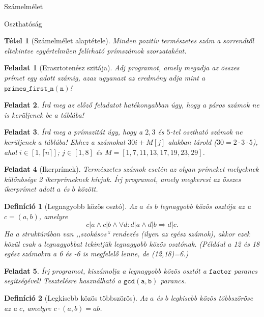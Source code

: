 \documentclass{amsbook}
\theoremstyle{mystyle}
\newtheorem{exercise}{Feladat}[part]
\newtheorem{definition}{Definíció}[section]
\newtheorem{theorem}{Tétel}[section]
\begin{document}
\begin{part}{Számelmélet}
\begin{section}{Oszthatóság}
  \begin{theorem}[Számelmélet alaptétele] Minden pozitív természetes szám a 
    sorrendtől eltekintve egyértelműen felírható prímszámok szorzataként.
  \end{theorem}

  \begin{exercise}[Erasztotenész szitája] Adj programot, amely megadja az 
    összes prímet egy adott számig, azaz ugyanazt az eredmény adja mint a 
    $\mathtt{primes\_first\_n(n)}$!
  \end{exercise}

  \begin{exercise} Írd meg az előző feladatot hatékonyabban úgy, hogy a páros
    számok ne is kerüljenek be a táblába!
  \end{exercise}

  \begin{exercise} Írd meg a prímszitát úgy, hogy a $2,3$ és $5$-tel osztható
    számok ne kerüljenek a táblába! Ehhez a számokat $30i+M[j]$ alakban tárold
    ($30=2\cdot 3\cdot 5$), ahol $i\in[1,\lceil n\rceil]$; $j\in[1,8]$ és
    $M=[1,7,11,13,17,19,23,29]$.
  \end{exercise}

  \begin{exercise}[Ikerprímek]
      Természetes számok esetén az olyan prímeket melyeknek különbsége 2
      ikerprímeknek hívjuk. Írj programot, amely megkeresi az összes ikerprímet
      adott $a$ és $b$ között.
  \end{exercise}

  \begin{definition}[Legnagyobb közös osztó]
    Az $a$ és $b$ legnagyobb közös osztója az a $c = (a,b)$, amelyre
    \[ c|a \wedge c|b \wedge \forall d: d|a \wedge d|b \Rightarrow d|c. \]
    Ha a struktúrában van ,,szokásos`` rendezés (ilyen az egész számok), akkor ezek 
    közül csak a legnagyobbat tekintjük legnagyobb közös osztónak. (Például a 12
    és 18 egész számokra a 6 és -6 is megfelelő lenne, de (12,18)=6.)
  \end{definition}

  \begin{exercise}
    Írj programot, kiszámolja a legnagyobb közös osztót a $\mathtt{factor}$
    parancs segítségével! Tesztelésre használható a $\mathtt{gcd(a,b)}$ parancs.
  \end{exercise}

  \begin{definition}[Legkisebb közös többszörös]
    Az $a$ és $b$ legkisebb közös többszöröse az a $c$, amelyre $c\cdot(a,b)=ab$.
  \end{definition}


\end{section}
\end{part}
\end{document}
